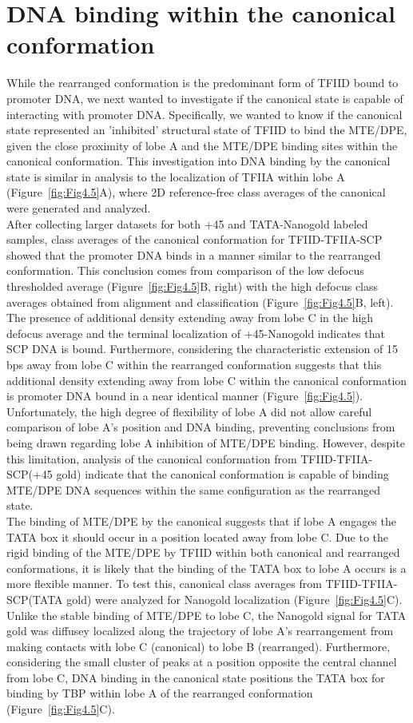 \section{DNA binding within the canonical conformation}

While the rearranged conformation is the predominant form of TFIID bound to promoter DNA, we next wanted to investigate if the canonical state is capable of interacting with promoter DNA. Specifically, we wanted to know if the canonical state represented an 'inhibited' structural state of TFIID to bind the MTE/DPE, given the close proximity of lobe A and the MTE/DPE binding sites within the canonical conformation. This investigation into DNA binding by the canonical state is similar in analysis to the localization of TFIIA within lobe A (Figure~\ref{fig:Fig4.5}A), where 2D reference-free class averages of the canonical were generated and analyzed. \\
\indent After collecting larger datasets for both +45 and TATA-Nanogold labeled samples, class averages of the canonical conformation for TFIID-TFIIA-SCP showed that the promoter DNA binds in a manner similar to the rearranged conformation. This conclusion comes from comparison of the low defocus thresholded average (Figure~\ref{fig:Fig4.5}B, right) with the high defocus class averages obtained from alignment and classification (Figure~\ref{fig:Fig4.5}B, left). The presence of additional density extending away from lobe C in the high defocus average and the terminal localization of +45-Nanogold indicates that SCP DNA is bound. Furthermore, considering the characteristic extension of 15 bps away from lobe C within the rearranged conformation suggests that this additional density extending away from lobe C within the canonical conformation is promoter DNA bound in a near identical manner (Figure~\ref{fig:Fig4.5}). Unfortunately, the high degree of flexibility of lobe A did not allow careful comparison of lobe A's position and DNA binding, preventing conclusions from being drawn regarding lobe A inhibition of MTE/DPE binding. However, despite this limitation, analysis of the canonical conformation from TFIID-TFIIA-SCP(+45 gold) indicate that the canonical conformation is capable of binding MTE/DPE DNA sequences within the same configuration as the rearranged state.\\
\indent The binding of MTE/DPE by the canonical suggests that if lobe A engages the TATA box it should occur in a position located away from lobe C. Due to the rigid binding of the MTE/DPE by TFIID within both canonical and rearranged conformations, it is likely that the binding of the TATA box to lobe A occurs is a more flexible manner.  To test this, canonical class averages from TFIID-TFIIA-SCP(TATA gold) were analyzed for Nanogold localization (Figure~\ref{fig:Fig4.5}C). Unlike the stable binding of MTE/DPE to lobe C, the Nanogold signal for TATA gold was diffusey localized along the trajectory of lobe A's rearrangement from making contacts with lobe C (canonical) to lobe B (rearranged). Furthermore, considering the small cluster of peaks at a position opposite the central channel from lobe C, DNA binding in the canonical state positions the TATA box for binding by TBP within lobe A of the rearranged conformation (Figure~\ref{fig:Fig4.5}C). \\
